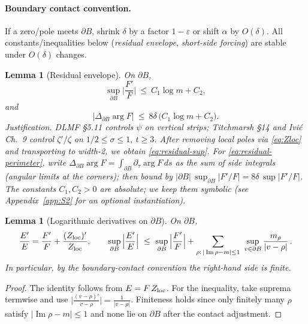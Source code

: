 \documentclass[11pt]{article}
\numberwithin{equation}{section}
\newtheorem{lemma}[theorem]{Lemma}
\theoremstyle{remark}
\DeclareMathOperator{\Imag}{Im}
\begin{document}
\paragraph{Boundary contact convention.}
If a zero/pole meets $\partial B$, shrink $\delta$ by a factor $1-\varepsilon$ or shift $\alpha$ by $O(\delta)$. All constants/inequalities below (\emph{residual envelope}, \emph{short-side forcing}) are stable under $O(\delta)$ changes. %

\begin{lemma}[Residual envelope]\label{lem:residual}
On $\partial B$,
\begin{equation}\label{eq:residual-sup}
\sup_{\partial B}\Big|\frac{F'}{F}\Big|\ \le\ C_1\log m + C_2,
\end{equation}
and
\begin{equation}\label{eq:residual-perimeter}
\big|\Delta_{\partial B}\arg F\big|\ \le\ 8\delta\,\big(C_1\log m+C_2\big).
\end{equation}
\emph{Justification.} DLMF §5.11 controls $\psi$ on vertical strips; Titchmarsh §14 and Ivi\'c Ch.~9 control $\zeta'/\zeta$ on $1/2\le\sigma\le 1,\ t\ge 3$. After removing local poles via \eqref{eq:Zloc} and transporting to width-2, we obtain \eqref{eq:residual-sup}. For \eqref{eq:residual-perimeter}, write $\Delta_{\partial B}\arg F=\int_{\partial B}\partial_\tau\arg F\,ds$ %
as the sum of side integrals (angular limits at the corners); then bound by $|\partial B|\,\sup_{\partial B}|F'/F|=8\delta\,\sup|F'/F|$. The constants $C_1,C_2>0$ are absolute; we keep them symbolic (see Appendix~\ref{app:S2} for an optional instantiation). %
\end{lemma}

\begin{lemma}[Logarithmic derivatives on $\partial B$]\label{lem:bridge-logs}
On $\partial B$,
\[
\frac{E'}{E}=\frac{F'}{F}+\frac{(Z_{\rm loc})'}{Z_{\rm loc}},\qquad
\sup_{\partial B}\Big|\frac{E'}{E}\Big|
\ \le\ \sup_{\partial B}\Big|\frac{F'}{F}\Big|+\sum_{\rho:\,|\Imag\rho-m|\le 1}\ \sup_{v\in\partial B}\frac{m_\rho}{|v-\rho|}\,.
\]
In particular, by the boundary-contact convention the right-hand side is finite.
\end{lemma}
\begin{proof}
The identity follows from $E=F\,Z_{\rm loc}$. For the inequality, take suprema termwise and use $\big|\frac{(v-\rho)'}{v-\rho}\big|=\frac{1}{|v-\rho|}$. Finiteness holds since only finitely many $\rho$ satisfy $|\Imag\rho-m|\le 1$ and none lie on $\partial B$ after the contact adjustment.
\end{proof}
\end{document}
